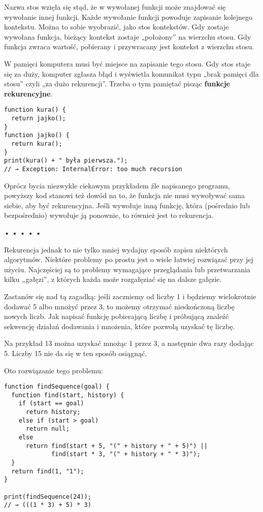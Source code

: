     
Nazwa stos wzięła się stąd, że w wywołanej funkcji może znajdować się wywołanie innej funkcji. Każde wywołanie funkcji powoduje zapisanie kolejnego kontekstu. Można to sobie wyobrazić, jako stos kontekstów. Gdy zostaje wywołana funkcja, bieżący kontekst zostaje „położony” na wierzchu stosu. Gdy funkcja zwraca wartość, pobierany i  przywracany jest kontekst z wierzchu stosu.

    
W pamięci komputera musi być miejsce na zapisanie tego stosu. Gdy stos staje się za duży, komputer zgłasza błąd i wyświetla komunikat typu „brak pamięci dla stosu” czyli „za dużo rekurencji”. Trzeba o tym pamiętać pisząc \textbf{funkcje rekurencyjne}.

    
\begin{verbatim} 
function kura() {
  return jajko();
}
function jajko() {
  return kura();
}
print(kura() + " była pierwsza.");
// → Exception: InternalError: too much recursion
\end{verbatim}
    
Oprócz bycia niezwykle ciekawym przykładem źle napisanego programu, powyższy kod stanowi też dowód na to, że funkcja nie musi wywoływać sama siebie, aby być rekurencyjna. Jeśli wywołuje inną funkcję, która (pośrednio lub bezpośrednio) wywołuje ją ponownie, to również jest to rekurencja.

  
  
\begin{center}
• • • • •
\end{center}
  
    
Rekurencja jednak to nie tylko mniej wydajny sposób zapisu niektórych algorytmów. Niektóre problemy po prostu jest o wiele łatwiej rozwiązać przy jej użyciu. Najczęściej są to problemy wymagające przeglądania lub przetwarzania kilku „gałęzi”, z których każda może rozgałęziać się na dalsze gałęzie.

    
Zastanów się nad tą zagadką: jeśli zaczniemy od liczby 1 i będziemy wielokrotnie dodawać 5 albo mnożyć przez 3, to możemy otrzymać nieskończoną liczbę nowych liczb. Jak napisać funkcję pobierającą liczbę i próbującą znaleźć sekwencję działań dodawania i mnożenia, które pozwolą uzyskać tę liczbę.

    
Na przykład 13 można uzyskać mnożąc 1 przez 3, a następnie dwa razy dodając 5. Liczby 15 nie da się w ten sposób osiągnąć.

    
Oto rozwiązanie tego problemu:

    
\begin{verbatim} 
function findSequence(goal) {
  function find(start, history) {
    if (start == goal)
      return history;
    else if (start > goal)
      return null;
    else
      return find(start + 5, "(" + history + " + 5)") ||
             find(start * 3, "(" + history + " * 3)");
  }
  return find(1, "1");
}

print(findSequence(24));
// → (((1 * 3) + 5) * 3)
\end{verbatim}
    
